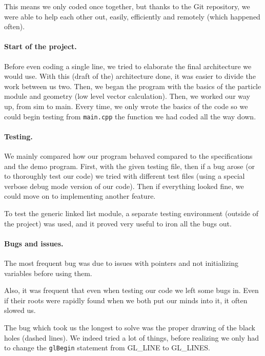 \documentclass[a4paper]{article} %
\begin{document}
\begin{multicols*}{2}
This means we only coded once together, but thanks to the Git repository,
we were able to help each other out, easily, efficiently and remotely (which happened often).

\paragraph{Start of the project.} Before even coding a single line, we tried to elaborate the final
architecture we would use. With this (draft of the) architecture done, it was easier
to divide the work between us two.
Then, we began the program with the basics of the particle module and geometry (low level vector calculation).
Then, we worked our way up, from sim to main. Every time, we only wrote the basics of the code so we could begin testing from \texttt{main.cpp}
the function we had coded all the way down.

\paragraph{Testing.}
We mainly compared how our program behaved compared to the specifications and the demo program.
First, with the given testing file, then if a bug arose (or to thoroughly test our code)
we tried with different test files (using a special verbose debug mode version of our code).
Then if everything looked fine, we could move on to implementing another feature.

To test the generic linked list module, a separate testing environment (outside of the project)
was used, and it proved very useful to iron all the bugs out.

\paragraph{Bugs and issues.}
The most frequent bug was due to issues with pointers and not initializing variables before using them.

Also, it was frequent that even when testing our code we left some bugs in.
Even if their roots were rapidly found when we both put our minds into it, it often slowed us.

The bug which took us the longest to solve was the proper drawing of the black holes (dashed lines).
We indeed tried a lot of things, before realizing we only had to change the \texttt{glBegin} statement from GL\_LINE to GL\_LINES.



\end{multicols*}
\end{document}
